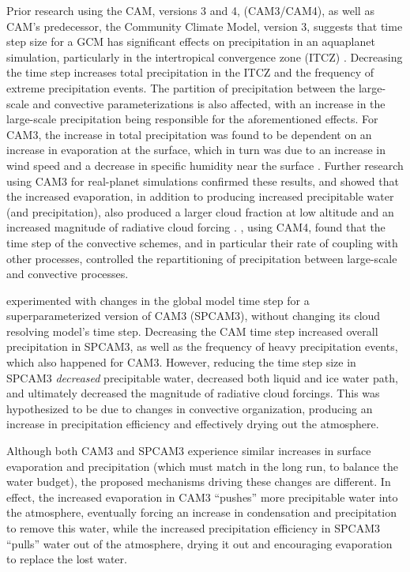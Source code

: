\documentclass [11pt, proquest] {uwthesis}[2020/02/24]
\begin{document}
Prior research using the CAM, versions 3 and 4, (CAM3/CAM4), as well as CAM's predecessor, the Community Climate Model, version 3, suggests that time step size for a GCM has significant effects on precipitation in an aquaplanet simulation, particularly in the intertropical convergence zone (ITCZ) \parencite{Williamson2003, Williamson2008, Mishra2008}. Decreasing the time step increases total precipitation in the ITCZ and the frequency of extreme precipitation events. The partition of precipitation between the large-scale and convective parameterizations is also affected, with an increase in the large-scale precipitation being responsible for the aforementioned effects. For CAM3, the increase in total precipitation was found to be dependent on an increase in evaporation at the surface, which in turn was due to an increase in wind speed and a decrease in specific humidity near the surface \parencite{Mishra2008}. Further research using CAM3 for real-planet simulations confirmed these results, and showed that the increased evaporation, in addition to producing increased precipitable water (and precipitation), also produced a larger cloud fraction at low altitude and an increased magnitude of radiative cloud forcing \parencite{Mishra2011}. \textcite{Williamson2013}, using CAM4, found that the time step of the convective schemes, and in particular their rate of coupling with other processes, controlled the repartitioning of precipitation between large-scale and convective processes.

\textcite{Yu2015} experimented with changes in the global model time step for a superparameterized version of CAM3 (SPCAM3), without changing its cloud resolving model's time step. Decreasing the CAM time step increased overall precipitation in SPCAM3, as well as the frequency of heavy precipitation events, which also happened for CAM3. However, reducing the time step size in SPCAM3 \emph{decreased} precipitable water, decreased both liquid and ice water path, and ultimately decreased the magnitude of radiative cloud forcings. This was hypothesized to be due to changes in convective organization, producing an increase in precipitation efficiency and effectively drying out the atmosphere.

Although both CAM3 and SPCAM3 experience similar increases in surface evaporation and precipitation (which must match in the long run, to balance the water budget), the proposed mechanisms driving these changes are different. In effect, the increased evaporation in CAM3 ``pushes'' more precipitable water into the atmosphere, eventually forcing an increase in condensation and precipitation to remove this water, while the increased precipitation efficiency in SPCAM3 ``pulls'' water out of the atmosphere, drying it out and encouraging evaporation to replace the lost water.
\end{document}
